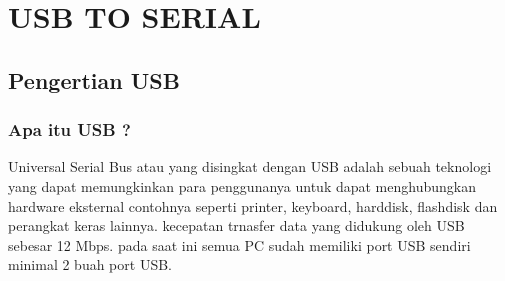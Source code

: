 
\section {USB TO SERIAL}

\subsection {Pengertian USB}
\subsubsection {Apa itu USB ?}
	Universal Serial Bus atau yang disingkat dengan USB adalah sebuah teknologi yang dapat memungkinkan para penggunanya untuk dapat menghubungkan hardware eksternal contohnya seperti printer, keyboard, harddisk, flashdisk dan perangkat keras lainnya. kecepatan trnasfer data yang didukung oleh USB sebesar 12 Mbps. pada saat ini semua PC sudah memiliki port USB sendiri minimal 2 buah port USB.

	